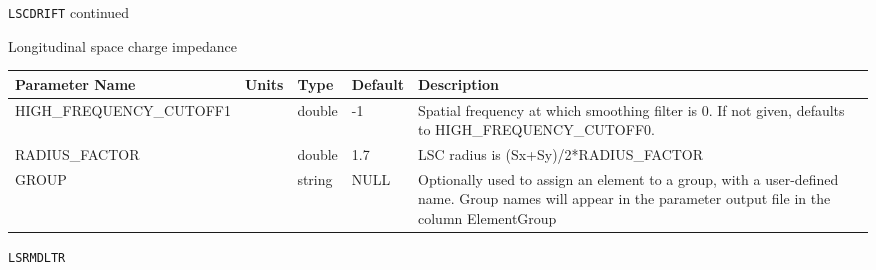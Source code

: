 \newpage
\begin{center}{\Large\verb|LSCDRIFT| continued}\end{center}
Longitudinal space charge impedance
\\
\begin{tabular}{|l|l|l|l|p{\descwidth}|} \hline
Parameter Name & Units & Type & Default & Description \\ \hline 
HIGH\_FREQUENCY\_CUTOFF1 &  & double &   -1 & Spatial frequency at which smoothing filter is 0.  If not given, defaults to HIGH\_FREQUENCY\_CUTOFF0.  \\ \hline 
RADIUS\_FACTOR &  & double &   1.7 & LSC radius is (Sx+Sy)/2*RADIUS\_FACTOR  \\ \hline 
GROUP &  & string & NULL & Optionally used to assign an element to a group, with a user-defined name.  Group names will appear in the parameter output file in the column ElementGroup  \\ \hline 
\end{tabular}

\vspace*{0.5in}

\newpage
\begin{center}{\Large\verb|LSRMDLTR|}\end{center}
